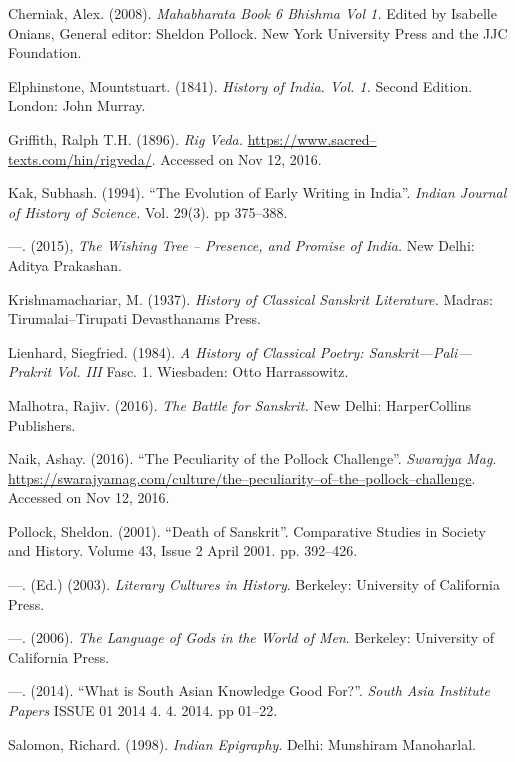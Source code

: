 \begin{thebibliography}{99}
 Cherniak, Alex. (2008). \textit{Mahabharata Book 6 Bhishma Vol 1.} Edited by Isabelle Onians, General editor: Sheldon Pollock. New York University Press and the JJC Foundation.

  Elphinstone, Mountstuart. (1841). \textit{History of India. Vol. 1.} Second Edition. London: John Murray.

  Griffith, Ralph T.H. (1896). \textit{Rig Veda.} \url{https://www.sacred–texts.com/hin/rigveda/}. Accessed on Nov 12, 2016.

  Kak, Subhash. (1994). “The Evolution of Early Writing in India”. \textit{Indian Journal of History of Science.} Vol. 29(3). pp 375–388.

  —. (2015), \textit{The Wishing Tree – Presence, and Promise of India.} New Delhi: Aditya Prakashan.

  Krishnamachariar, M. (1937). \textit{History of Classical Sanskrit Literature.} Madras: Tirumalai–Tirupati Devasthanams Press.

  Lienhard, Siegfried. (1984). \textit{A History of Classical Poetry: Sanskrit—Pali—Prakrit Vol. III} Fasc. 1. Wiesbaden: Otto Harrassowitz.

  Malhotra, Rajiv. (2016). \textit{The Battle for Sanskrit.} New Delhi: HarperCollins Publishers.

  Naik, Ashay. (2016). “The Peculiarity of the Pollock Challenge”. \textit{Swarajya Mag}. \url{https://swarajyamag.com/culture/the–peculiarity–of–the–pollock–challenge}. Accessed on Nov 12, 2016.

  Pollock, Sheldon. (2001). “Death of Sanskrit”. Comparative Studies in Society and History. Volume 43, Issue 2 April 2001. pp. 392–426.

  —. (Ed.) (2003). \textit{Literary Cultures in History}. Berkeley: University of California Press.

  —. (2006). \textit{The Language of Gods in the World of Men}. Berkeley: University of California Press.

  —. (2014). “What is South Asian Knowledge Good For?”. \textit{South Asia Institute Papers} ISSUE 01 2014 4. 4. 2014. pp 01–22.

  Salomon, Richard. (1998). \textit{Indian Epigraphy}. Delhi: Munshiram Manoharlal.


\end{thebibliography}
